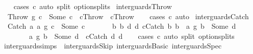 \begin{isabellebody}
%
\isadelimproof
\ \ %
\endisadelimproof
%
\isatagproof
{}\isamarkupfalse%
\ {\isacharparenleft}cases\ c{}{\isacharparenright}\ {\isacharparenleft}auto\ split{\isacharcolon}\ option{\isachardot}splits{\isacharparenright}%
\endisatagproof
{\isafoldproof}%
%
\isadelimproof
\isanewline
%
\endisadelimproof
\isanewline
{}\isamarkupfalse%
\ inter{\isacharunderscore}guards{\isacharunderscore}Throw{\isacharcolon}\isanewline
\ \ {\isachardoublequoteopen}{\isacharparenleft}Throw\ {\isasyminter}\isactrlsub g\ c{}{\isacharparenright}\ {\isacharequal}\ Some\ c\ {\isacharequal}\ {\isacharparenleft}c{}{\isacharequal}Throw\ {\isasymand}\ c{\isacharequal}Throw{\isacharparenright}{\isachardoublequoteclose}\isanewline
%
\isadelimproof
\ \ %
\endisadelimproof
%
\isatagproof
{}\isamarkupfalse%
\ {\isacharparenleft}cases\ c{}{\isacharparenright}\ auto%
\endisatagproof
{\isafoldproof}%
%
\isadelimproof
\isanewline
%
\endisadelimproof
\isanewline
{}\isamarkupfalse%
\ inter{\isacharunderscore}guards{\isacharunderscore}Catch{\isacharcolon}\isanewline
\ \ {\isachardoublequoteopen}{\isacharparenleft}Catch\ a{}\ a{}\ {\isasyminter}\isactrlsub g\ c{}{\isacharparenright}\ {\isacharequal}\ Some\ c\ {\isacharequal}\ \isanewline
\ \ \ \ \ {\isacharparenleft}{\isasymexists}b{}\ b{}\ d{}\ d{}{\isachardot}\ c{}{\isacharequal}Catch\ b{}\ b{}\ {\isasymand}\ {\isacharparenleft}a{}\ {\isasyminter}\isactrlsub g\ b{}{\isacharparenright}\ {\isacharequal}\ Some\ d{}\ {\isasymand}\ \isanewline
\ \ \ \ \ \ \ \ {\isacharparenleft}a{}\ {\isasyminter}\isactrlsub g\ b{}{\isacharparenright}\ {\isacharequal}\ Some\ d{}\ {\isasymand}\ c{\isacharequal}Catch\ d{}\ d{}{\isacharparenright}{\isachardoublequoteclose}\isanewline
%
\isadelimproof
\ \ %
\endisadelimproof
%
\isatagproof
{}\isamarkupfalse%
\ {\isacharparenleft}cases\ c{}{\isacharparenright}\ {\isacharparenleft}auto\ split{\isacharcolon}\ option{\isachardot}splits{\isacharparenright}%
\endisatagproof
{\isafoldproof}%
%
\isadelimproof
\isanewline
%
\endisadelimproof
\isanewline
\isanewline
{}\isamarkupfalse%
\ inter{\isacharunderscore}guards{\isacharunderscore}simps\ {\isacharequal}\ inter{\isacharunderscore}guards{\isacharunderscore}Skip\ inter{\isacharunderscore}guards{\isacharunderscore}Basic\ inter{\isacharunderscore}guards{\isacharunderscore}Spec\isanewline

\end{isabellebody}
